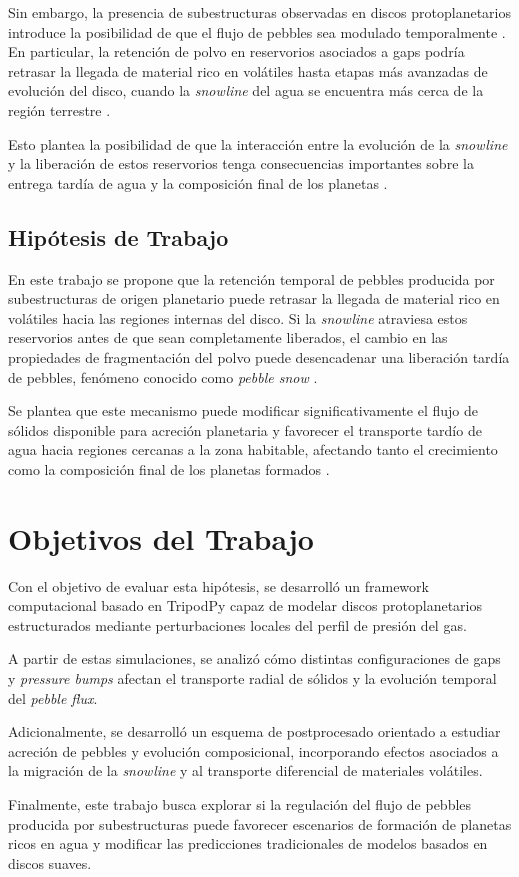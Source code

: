 Sin embargo, la presencia de subestructuras observadas en discos protoplanetarios introduce la posibilidad de que el flujo de pebbles sea modulado temporalmente \citep{Pinilla2012, Stammler2022}. En particular, la retención de polvo en reservorios asociados a gaps podría retrasar la llegada de material rico en volátiles hasta etapas más avanzadas de evolución del disco, cuando la \textit{snowline} del agua se encuentra más cerca de la región terrestre \citep{Oka2011, Bitsch2015}.

Esto plantea la posibilidad de que la interacción entre la evolución de la \textit{snowline} y la liberación de estos reservorios tenga consecuencias importantes sobre la entrega tardía de agua y la composición final de los planetas \citep{Banzatti2023, McCloat2025}.


\subsection{Hipótesis de Trabajo}

En este trabajo se propone que la retención temporal de pebbles producida por subestructuras de origen planetario puede retrasar la llegada de material rico en volátiles hacia las regiones internas del disco. Si la \textit{snowline} atraviesa estos reservorios antes de que sean completamente liberados, el cambio en las propiedades de fragmentación del polvo puede desencadenar una liberación tardía de pebbles, fenómeno conocido como \textit{pebble snow} \citep{Drazkowska2021, McCloat2025}.

Se plantea que este mecanismo puede modificar significativamente el flujo de sólidos disponible para acreción planetaria y favorecer el transporte tardío de agua hacia regiones cercanas a la zona habitable, afectando tanto el crecimiento como la composición final de los planetas formados \citep{Bitsch2021, Krijt2025, Astrakhantsev2026}.

\section{Objetivos del Trabajo}

Con el objetivo de evaluar esta hipótesis, se desarrolló un framework computacional basado en TripodPy capaz de modelar discos protoplanetarios estructurados mediante perturbaciones locales del perfil de presión del gas.

A partir de estas simulaciones, se analizó cómo distintas configuraciones de gaps y \textit{pressure bumps} afectan el transporte radial de sólidos y la evolución temporal del \textit{pebble flux}.

Adicionalmente, se desarrolló un esquema de postprocesado orientado a estudiar acreción de pebbles y evolución composicional, incorporando efectos asociados a la migración de la \textit{snowline} y al transporte diferencial de materiales volátiles.

Finalmente, este trabajo busca explorar si la regulación del flujo de pebbles producida por subestructuras puede favorecer escenarios de formación de planetas ricos en agua y modificar las predicciones tradicionales de modelos basados en discos suaves.
